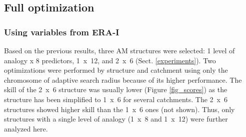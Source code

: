 \documentclass[draft]{agujournal2019}
\begin{document}
\subsection{Full optimization}
\label{best_multi}

\subsubsection{Using variables from ERA-I}

Based on the previous results, three AM structures were selected: 1 level of analogy x 8 predictors, 1~x~12, and 2~x~6 (Sect. \ref{experiments}). Two optimizations were performed by structure and catchment using only the chromosome of adaptive search radius because of its higher performance. The skill of the 2~x~6 structure was usually lower (Figure \ref{fig_scores}) as the structure has been simplified to 1~x~6 for several catchments. The 2~x~6 structures showed higher skill than the 1~x~6 ones (not shown). Thus, only structures with a single level of analogy (1~x~8 and 1~x~12) were further analyzed here. 
\end{document}
